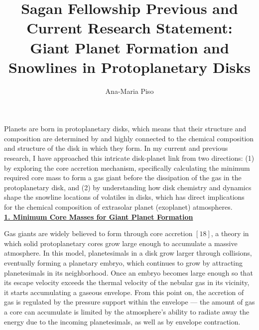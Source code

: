 \documentclass[12pt, letterpaper]{article}
\date{}
\title{\Large Sagan Fellowship Previous and Current Research Statement: \\
Giant Planet Formation and Snowlines in Protoplanetary Disks\vspace{-2ex}}
\author{Ana-Maria Piso \vspace{-2ex}}
\begin{document}
\maketitle


\vspace{-1.5cm}


Planets are born in protoplanetary disks, which means that their structure and composition are determined by and highly connected to the chemical composition and structure of the disk in which they form. In my current and previous research, I have approached this intricate disk-planet link from two directions: (1) by exploring the core accretion mechanism, specifically calculating the minimum required core mass to form a gas giant before the dissipation of the gas in the protoplanetary disk, and (2) by understanding how disk chemistry and dynamics shape the snowline locations of volatiles in disks, which has direct implications for the chemical composition of extrasolar planet (exoplanet) atmospheres. \\
\underline{\textbf{1. Minimum Core Masses for Giant Planet Formation}}

Gas giants are widely believed to form through core accretion $[18]$, a theory in which solid protoplanetary cores grow large enough to accumulate a massive atmosphere. In this model, planetesimals in a disk grow larger through collisions, eventually forming a planetary embryo, which continues to grow by attracting planetesimals in its neighborhood. Once an embryo becomes large enough so that its escape velocity exceeds the thermal velocity of the nebular gas in its vicinity, it starts accumulating a gaseous envelope. From this point on, the accretion of gas is regulated by the pressure support within the envelope --- the amount of gas a core can accumulate is limited by the atmosphere's ability to radiate away the energy due to the incoming planetesimals, as well as by envelope contraction.  
\end{document}
